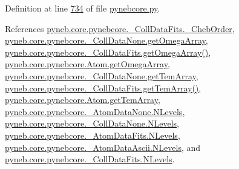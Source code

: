 Definition at line \hyperlink{pynebcore_8py_source_l00734}{734} of file \hyperlink{pynebcore_8py_source}{pynebcore.\+py}.



References \hyperlink{pynebcore_8py_source_l00656}{pyneb.\+core.\+pynebcore.\+\_\+\+Coll\+Data\+Fits.\+\_\+\+Cheb\+Order}, \hyperlink{pynebcore_8py_source_l00067}{pyneb.\+core.\+pynebcore.\+\_\+\+Coll\+Data\+None.\+get\+Omega\+Array}, \hyperlink{pynebcore_8py_source_l00783}{pyneb.\+core.\+pynebcore.\+\_\+\+Coll\+Data\+Fits.\+get\+Omega\+Array()}, \hyperlink{pynebcore_8py_source_l01247}{pyneb.\+core.\+pynebcore.\+Atom.\+get\+Omega\+Array}, \hyperlink{pynebcore_8py_source_l00068}{pyneb.\+core.\+pynebcore.\+\_\+\+Coll\+Data\+None.\+get\+Tem\+Array}, \hyperlink{pynebcore_8py_source_l00880}{pyneb.\+core.\+pynebcore.\+\_\+\+Coll\+Data\+Fits.\+get\+Tem\+Array()}, \hyperlink{pynebcore_8py_source_l01248}{pyneb.\+core.\+pynebcore.\+Atom.\+get\+Tem\+Array}, \hyperlink{pynebcore_8py_source_l00062}{pyneb.\+core.\+pynebcore.\+\_\+\+Atom\+Data\+None.\+N\+Levels}, \hyperlink{pynebcore_8py_source_l00075}{pyneb.\+core.\+pynebcore.\+\_\+\+Coll\+Data\+None.\+N\+Levels}, \hyperlink{pynebcore_8py_source_l00155}{pyneb.\+core.\+pynebcore.\+\_\+\+Atom\+Data\+Fits.\+N\+Levels}, \hyperlink{pynebcore_8py_source_l00404}{pyneb.\+core.\+pynebcore.\+\_\+\+Atom\+Data\+Ascii.\+N\+Levels}, and \hyperlink{pynebcore_8py_source_l00637}{pyneb.\+core.\+pynebcore.\+\_\+\+Coll\+Data\+Fits.\+N\+Levels}.


